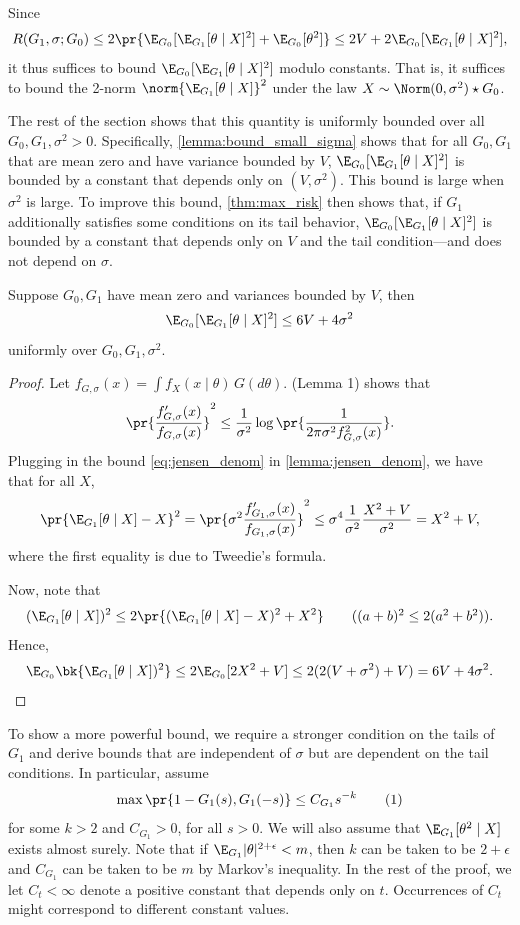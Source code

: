 \documentclass[12pt, reqno]{amsart}
\newcommand\numberthis{\addtocounter{equation}{1}\tag{\theequation}}
\numberwithin{equation}{section}
\begin{document}
\begin{refsection}
\begin{appendices}
Since \[ R(G_1, \sigma; G_0) \le 2\pr{
\E_{G_0}[\E_{G_1}[\theta \mid X]^2] + \E_{G_0}[\theta^2] } \le 2V + 2\E_{G_0}[\E_{G_1}
 [\theta \mid X]^2],\] it thus suffices to bound $\E_{G_0}[\E_{G_1}[\theta \mid X]^2]$
 modulo constants. That is,  it suffices to bound the 2-norm $\norm{\E_{G_1}
 [\theta \mid X]}^2$ under the law $X \sim \Norm(0,\sigma^2)
\star G_0$. 

The rest of the section shows that this quantity is uniformly bounded over all $G_0,
G_1, \sigma^2 > 0$. Specifically, \cref{lemma:bound_small_sigma} shows that for all $G_0,
G_1$ that are mean zero and have variance bounded by $V$, $\E_{G_0}[\E_{G_1}[\theta
\mid X]^2]$ is bounded by a constant that depends only on $(V, \sigma^2)$. This bound is
 large when $\sigma^2$ is large. To improve this bound, \cref{thm:max_risk} then shows
 that, if $G_1$ additionally satisfies some conditions on its tail behavior, $\E_ {G_0}
 [\E_{G_1}[\theta
\mid X]^2]$ is bounded by a constant that depends only on $V$ and the tail condition---and
does not depend on $\sigma$.


\begin{lemma}
\label{lemma:bound_small_sigma}
Suppose $G_0, G_1$ have mean zero and variances bounded by $V$, then
\[
\E_{G_0}[\E_{G_1}[\theta \mid X]^2] \le 6V + 4\sigma^2
\]
uniformly over $G_0, G_1, \sigma^2$. 
\end{lemma}
\begin{proof}
Let $f_{G,\sigma}(x) = \int f_X(x \mid \theta) \,G(d\theta)$.
\citet{jiang2020general} (Lemma 1) shows that \[
\pr{\frac{f'_{G,\sigma}(x)}{f_{G,\sigma}(x)}}^2 \le \frac{1}{\sigma^2} \log \pr{\frac{1}
{2\pi \sigma^2 f^2_{G,\sigma}(x)}}.
\]
Plugging in the bound \eqref{eq:jensen_denom} in \cref{lemma:jensen_denom}, we have that
for all $X$, \[
\pr{\E_{G_1}[\theta \mid X] - X}^2 = \pr{\sigma^2\frac{f'_{G_1,\sigma}(x)}{f_
{G_1,\sigma} (x)}}^2 \le \sigma^4 \frac{1}
{\sigma^2} \frac{X^2 + V}
{\sigma^2} = X^2 + V,
\]
where the first equality is due to Tweedie's formula. 

Now, note that \[
(\E_{G_1}[\theta \mid X])^2 \le 2 \pr{
  (\E_{G_1}[\theta \mid X] - X)^2 + X^2
} \tag{$(a+b)^2 \le 2(a^2 + b^2)$}.
\]
Hence, \[
\E_{G_0}\bk{
  \E_{G_1}[\theta \mid X])^2
} \le 2 \E_{G_0}[2X^2+V] \le 2(2(V+\sigma^2) + V) = 6V + 4\sigma^2. \qedhere
\]
\end{proof}


To show a more powerful bound, we require a stronger condition on the tails of $G_1$ and
derive bounds that are independent of $\sigma$ but are dependent on the tail conditions.
In particular, assume
\[ \max\pr{1-G_1(s), G_1(-s) }\le C_{G_1} s^{-k} \numberthis\label{eq:g1_cond}
\]
for some $k > 2$ and $C_{G_1} > 0$, for all $s > 0$. We will also assume that $\E
_{G_1}[\theta^2 \mid X]$ exists almost surely. Note that if $\E_{G_1} |\theta|^
{2+\epsilon} < m$, then $k$ can be taken to be $2+\epsilon$ and $C_{G_1}$ can be taken to
be $m$ by Markov's inequality. In the rest of the proof, we let $C_t < \infty$ denote a
positive constant that depends only on $t$. Occurrences of
$C_t$ might correspond to different constant values. 



\end{appendices}
\end{refsection}
\end{document}
